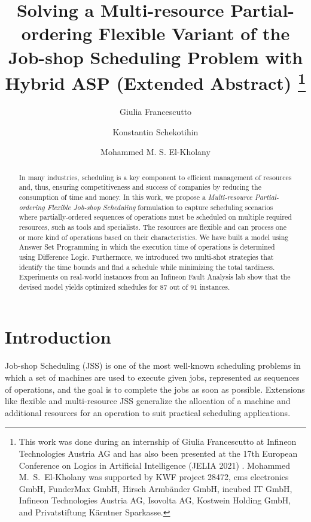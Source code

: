 \documentclass[submission,copyright,creativecommons]{eptcs}
\title{Solving a Multi-resource Partial-ordering Flexible Variant of the Job-shop Scheduling Problem with Hybrid ASP (Extended Abstract) \thanks{This work was done during an internship of Giulia Francescutto at Infineon Technologies Austria AG and has also been presented at the 17th European Conference on Logics in Artificial Intelligence (JELIA 2021) \cite{frscel21a}.
Mohammed M.\ S.\ El-Kholany was supported by
KWF project 28472,
cms electronics GmbH,
FunderMax GmbH,
Hirsch Armbänder GmbH,
incubed IT GmbH,
Infineon Technologies Austria AG,
Isovolta AG,
Kostwein Holding GmbH, and
Privatstiftung Kärntner Sparkasse.}}
\author{Giulia Francescutto
\institute{Siemens AG {\"O}sterreich, Vienna, Austria}
\email{giulia.francescutto@siemens.com}
\and
Konstantin Schekotihin
\institute{University of Klagenfurt,
Klagenfurt, Austria}
\email{konstantin.schekotihin@aau.at}
\and
Mohammed M. S. El-Kholany
\institute{University of Klagenfurt, Klagenfurt, Austria}
\institute{Cairo University, Cairo, Egypt}
\email{mohammed.el-kholany@aau.at}
}
\newcommand{\jss}{MPF-JSS\xspace}
\begin{document}
\maketitle

\begin{abstract}
  In many industries, scheduling is a key component to efficient management of resources and, thus, ensuring competitiveness and success of companies by reducing the consumption of time and money. In this work, we propose a \emph{Multi-resource Partial-ordering Flexible Job-shop Scheduling} %
  formulation to capture scheduling scenarios where partially-ordered sequences of operations must be scheduled on multiple required resources, such as tools and specialists.
  The resources are flexible and can process one or more kind of operations based on their characteristics. We have built a model using Answer Set Programming %
  in which the execution time of operations is determined using Difference Logic. Furthermore, we introduced two multi-shot strategies that identify the time bounds and find a schedule while minimizing the total tardiness. 
  Experiments on real-world %
  instances from an Infineon Fault Analysis lab %
  show that the devised model %
  yields optimized schedules for $87$ out of $91$ %
  instances.
\end{abstract}

\section{Introduction}
Job-shop Scheduling (JSS) \cite{johnson1954optimal} is one of the most well-known scheduling problems in which a set of machines are used to execute given jobs, represented as sequences of operations, and the goal is to complete the jobs as soon as possible.
Extensions like flexible \cite{brucker1990job} and multi-resource
\cite{DBLP:journals/eor/Dauzere-PeresRL98} JSS
generalize the allocation of a machine and additional resources for an operation
to suit practical scheduling applications.
\end{document}
